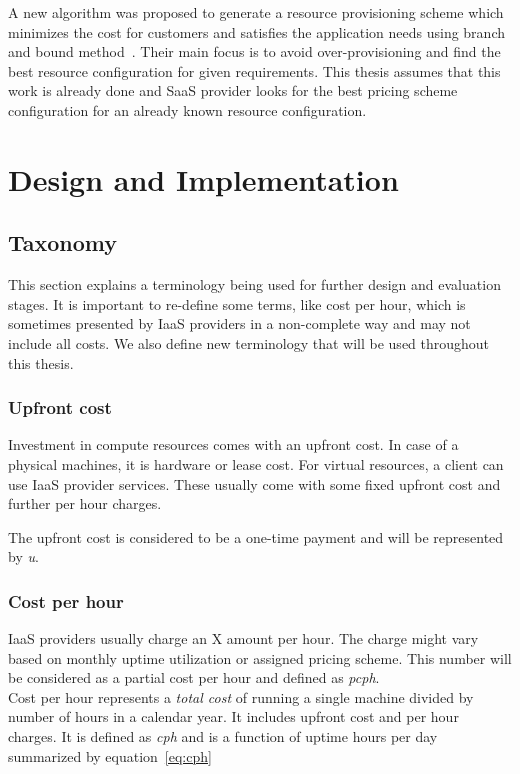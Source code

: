 \documentclass[]{final_report}
\begin{document}
A new algorithm was proposed to generate a resource provisioning scheme which minimizes the cost for customers and satisfies the application needs using branch and bound method~\cite{6295066}. Their main focus is to avoid over-provisioning and find the best resource configuration for given requirements. This thesis assumes that this work is already done and SaaS provider looks for the best pricing scheme configuration for an already known resource configuration.


\chapter{Design and Implementation}

\section{Taxonomy}
This section explains a terminology being used for further design and evaluation stages. It is important to re-define some terms, like cost per hour, which is sometimes presented by IaaS providers in a non-complete way and may not include all costs. We also define new terminology that will be used throughout this thesis.

\subsection{Upfront cost}

Investment in compute resources comes with an upfront cost. In case of a physical machines, it is hardware or lease cost. For virtual resources, a client can use IaaS provider services. These usually come with some fixed upfront cost and further per hour charges. \par

The upfront cost is considered to be a one-time payment and will be represented by \textit{u}.

\subsection{Cost per hour}

IaaS providers usually charge an X amount per hour. The charge might vary based on monthly uptime utilization or assigned pricing scheme. This number will be considered as a partial cost per hour and defined as \textit{pcph}. \\
Cost per hour represents a \textit{total cost} of running a single machine divided by number of hours in a calendar year. It includes upfront cost and per hour charges. It is defined as \textit{cph} and is a function of uptime hours per day summarized by equation~\ref{eq:cph}
\end{document}

